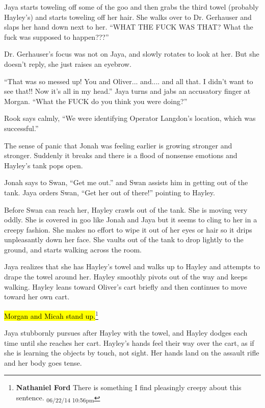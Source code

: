 Jaya starts toweling off some of the goo and then grabs the third towel (probably Hayley's) and starts toweling off her hair.  She walks over to Dr. Gerhauser and slaps her hand down next to her.  ``WHAT THE FUCK WAS THAT?  What the fuck was supposed to happen???''

Dr. Gerhauser's focus was not on Jaya, and slowly rotates to look at her. But she doesn't reply, she just raises an eyebrow.

``That was so messed up!  You and Oliver... and.... and all that.  I didn't want to see that!!  Now it's all in my head.''  Jaya turns and jabs an accusatory finger at Morgan.   ``What the FUCK do you think you were doing?''



Rook says calmly, ``We were identifying Operator Langdon's location, which was successful.''



The sense of panic that Jonah was feeling earlier is growing stronger and stronger.  Suddenly it breaks and there is a flood of nonsense emotions and Hayley's tank pops open.



Jonah says to Swan, ``Get me out.'' and Swan assists him in getting out of the tank.  Jaya orders Swan, ``Get her out of there!'' pointing to Hayley.



Before Swan can reach her, Hayley crawls out of the tank.  She is moving very oddly.  She is covered in goo like Jonah and Jaya but it seems to cling to her in a creepy fashion.  She makes no effort to wipe it out of her eyes or hair so it drips unpleasantly down her face.  She vaults out of the tank to drop lightly to the ground, and starts walking across the room.



Jaya realizes that she has Hayley's towel and walks up to Hayley and attempts to drape the towel around her.  Hayley smoothly pivots out of the way and keeps walking.  Hayley leans toward Oliver's cart briefly and then continues to move toward her own cart.



\hl{Morgan and Micah stand up.}\footnote{\textbf{Nathaniel Ford }There is something I find pleasingly creepy about this sentence. \textsubscript{06/22/14 10:56pm}}  



Jaya stubbornly pursues after Hayley with the towel, and Hayley dodges each time until she reaches her cart.  Hayley's hands feel their way over the cart, as if she is learning the objects by touch, not sight.  Her hands land on the assault rifle and her body goes tense.



